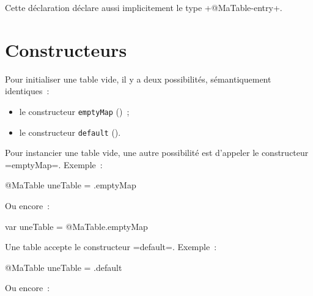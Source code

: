 Cette déclaration déclare aussi implicitement le type \ggs+@MaTable-entry+.





\section{Constructeurs}

Pour initialiser une table vide, il y a deux possibilités, sémantiquement identiques~:
\begin{itemize}
  \item le constructeur \texttt{emptyMap} ()~; 
  \item le constructeur \texttt{default} (). 
\end{itemize}


%
%
%


Pour instancier une table vide, une autre possibilité est d'appeler le constructeur \ggs=emptyMap=. Exemple~:
\begin{galgas}
@MaTable uneTable = .emptyMap
\end{galgas}

Ou encore~:

\begin{galgas}
var uneTable = @MaTable.emptyMap
\end{galgas}

 



Une table accepte le constructeur \ggs=default=. Exemple~:
\begin{galgas}
@MaTable uneTable = .default
\end{galgas}

Ou encore~:


